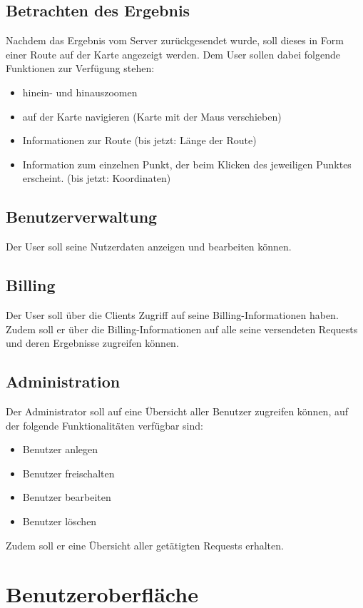 \documentclass[a4paper,10pt,titlepage]{article}
\begin{document}
\subsection{Betrachten des Ergebnis}
Nachdem das Ergebnis vom Server zurückgesendet wurde, soll dieses in Form einer Route auf der Karte angezeigt werden.
Dem User sollen dabei folgende Funktionen zur Verfügung stehen:
\begin{itemize}
 \item hinein- und hinauszoomen
 \item auf der Karte navigieren (Karte mit der Maus verschieben)
 \item Informationen zur Route (bis jetzt: Länge der Route)
 \item Information zum einzelnen Punkt, der beim Klicken des jeweiligen Punktes erscheint. (bis jetzt: Koordinaten)
\end{itemize}

\subsection{Benutzerverwaltung}
Der User soll seine Nutzerdaten anzeigen und bearbeiten können.

\subsection{Billing}
Der User soll über die Clients Zugriff auf seine Billing-Informationen haben.
Zudem soll er über die Billing-Informationen auf alle seine versendeten Requests und deren Ergebnisse zugreifen können.

\subsection{Administration}
Der Administrator soll auf eine Übersicht aller Benutzer zugreifen können, auf der folgende Funktionalitäten verfügbar sind:
\begin{itemize}
 \item Benutzer anlegen
 \item Benutzer freischalten
 \item Benutzer bearbeiten
 \item Benutzer löschen
\end{itemize}

Zudem soll er eine Übersicht aller getätigten Requests erhalten.

\clearpage
\section{Benutzeroberfläche}
\end{document}
